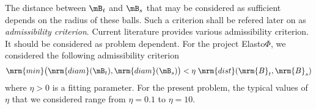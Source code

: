The distance between $\mB_{t}$ and $\mB_{s}$ that may be considered as sufficient depends on the radius of these balls. 
Such a criterion shall be refered later on as \textit{admissibility criterion}. Current literature provides various 
admissibility criterion. It should be considered as problem dependent. For the project Elasto$\Phi$, we considered the 
following admissibility criterion
\begin{equation}\label{AdmissibilityCondition}
\mrm{min}\big( \mrm{diam}(\mB_{t}),\mrm{diam}(\mB_{s})\big)< \eta\;\mrm{dist}(\mrm{B}_{t},\mrm{B}_{s})
\end{equation}
where $\eta>0$ is a fitting parameter. For the present problem, the typical values of $\eta$ that we considered  
range from $\eta = 0.1$ to $\eta = 10$.







